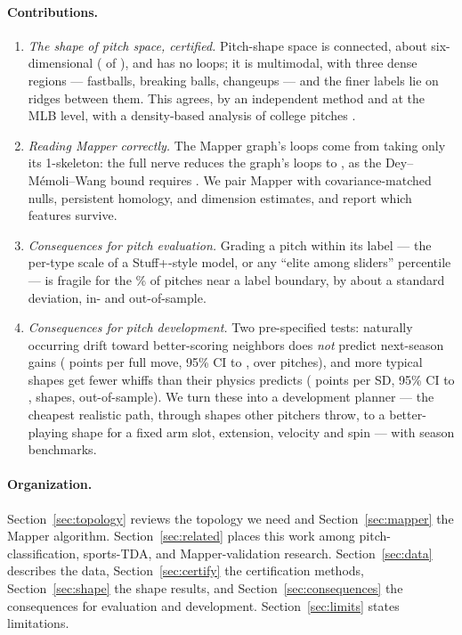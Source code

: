 \documentclass{article}
\theoremstyle{definition}
\theoremstyle{remark}
\begin{document}
\paragraph{Contributions.}
\begin{enumerate}
  \item \emph{The shape of pitch space, certified.} Pitch-shape space is connected, about six-dimensional (\DimMLE{} of \NFeatures), and has no loops; it is multimodal, with three dense regions --- fastballs, breaking balls, changeups --- and the finer labels lie on ridges between them. This agrees, by an independent method and at the MLB level, with a density-based analysis of college pitches \parencite{maloof2026classify}.
  \item \emph{Reading Mapper correctly.} The Mapper graph's loops come from taking only its 1-skeleton: the full nerve reduces the graph's \GraphBone{} loops to \NerveBone, as the Dey--M\'emoli--Wang bound requires \parencite{deymemoliwang2017}. We pair Mapper with covariance-matched nulls, persistent homology, and dimension estimates, and report which features survive.
  \item \emph{Consequences for pitch evaluation.} Grading a pitch within its label --- the per-type scale of a Stuff+-style model, or any ``elite among sliders'' percentile --- is fragile for the \LSTwentyFiveBoundaryPct\% of pitches near a label boundary, by about a standard deviation, in- and out-of-sample.
  \item \emph{Consequences for pitch development.} Two pre-specified tests: naturally occurring drift toward better-scoring neighbors does \emph{not} predict next-season gains (\DevBetterBeta{} points per full move, 95\% CI \DevBetterLo{} to \DevBetterHi, over \DevN{} pitches), and more typical shapes get fewer whiffs than their physics predicts (\TypBeta{} points per SD, 95\% CI \TypLo{} to \TypHi, \TypN{} shapes, out-of-sample). We turn these into a development planner --- the cheapest realistic path, through shapes other pitchers throw, to a better-playing shape for a fixed arm slot, extension, velocity and spin --- with season benchmarks.
\end{enumerate}

\paragraph{Organization.}
Section~\ref{sec:topology} reviews the topology we need and Section~\ref{sec:mapper} the Mapper algorithm.
Section~\ref{sec:related} places this work among pitch-classification, sports-TDA, and Mapper-validation research.
Section~\ref{sec:data} describes the data, Section~\ref{sec:certify} the certification methods, Section~\ref{sec:shape} the shape results, and Section~\ref{sec:consequences} the consequences for evaluation and development.
Section~\ref{sec:limits} states limitations.
\end{document}
